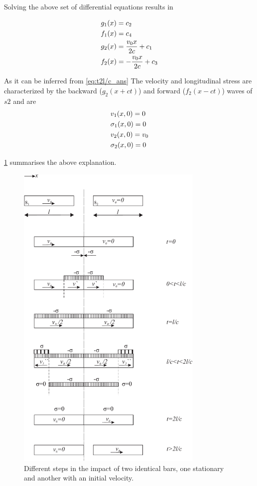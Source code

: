 \documentclass{article}
\begin{document}
Solving the above set of differential equations results in

\begin{align}
    & g_1(x) = c_2 \notag\\
    & f_1(x) = c_4 \notag\\
    & g_2(x) = \frac{v_0 x}{2c} + c_1 \notag\\
    & f_2(x) = -\frac{v_0 x}{2c} + c_3
    \label{eq:t2l/c_ans}
\end{align}

As it can be inferred from \cref{eq:t2l/c_ans} The velocity and longitudinal stress are characterized by the backward ($g_2(x + ct)$) and forward ($f_2(x - ct)$) waves of $s2$ and are 
\begin{align}
    & v_1(x, 0) = 0 \notag\\
    & \sigma_1(x, 0) = 0 \notag\\
    & v_2(x, 0) = v_0 \notag\\
    & \sigma_2(x, 0) = 0 
    \label{eq:t2l/c_result}
\end{align}

\cref{fig:p2} summarises the above explanation.

\begin{figure}
    \centering
    \includegraphics[width = 0.8\textwidth ]{figures/impact_of_two_bars_dalembert_solution.pdf}
    \caption{Different steps in the impact of two identical bars, one stationary and another with an initial velocity.}
    \label{fig:p2}
\end{figure}


% 
% 
\end{document}
